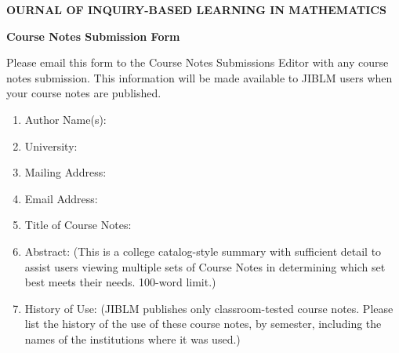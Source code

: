 \documentclass[12pt]{article}
\begin{document}
\begin{center}
{\bf {}OURNAL OF {\Large I}NQUIRY-{\Large B}ASED
{\Large L}EARNING
\medskip
\noindent IN {\Large M}ATHEMATICS}
\end{center}

\medskip
\begin{center}
{\large \bf Course Notes Submission Form}
\end{center}

Please email this form to the Course Notes Submissions Editor with any course notes submission. This information will be made available to JIBLM users when your course notes are published.

\begin{enumerate}

\item Author Name(s):

\item University:

\item Mailing Address:

\item Email Address:

\item Title of Course Notes:

\item Abstract: (This is a college catalog-style summary with sufficient detail to assist users viewing multiple sets of Course Notes
in determining which set best meets their needs.  100-word limit.)

\item History of Use: (JIBLM publishes only classroom-tested course notes. Please list the history of the use of these course notes, by semester, including the names of the institutions where it was used.)
\end{enumerate}
\end{document}
